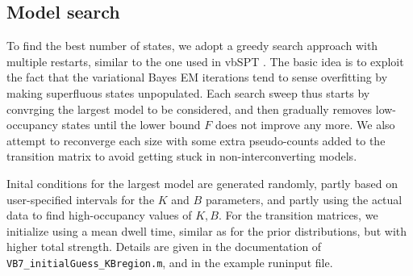 \subsection{Model search}
To find the best number of states, we adopt a greedy search approach
with multiple restarts, similar to the one used in vbSPT
\cite{persson2013}. The basic idea is to exploit the fact that the
variational Bayes EM iterations tend to sense overfitting by making
superfluous states unpopulated. Each search sweep thus starts by
convrging the largest model to be considered, and then gradually
removes low-occupancy states until the lower bound $F$ does not
improve any more. We also attempt to reconverge each size with some
extra pseudo-counts added to the transition matrix to avoid getting
stuck in non-interconverting models.

Inital conditions for the largest model are generated randomly, partly
based on user-specified intervals for the $K$ and $B$ parameters, and
partly using the actual data to find high-occupancy values of
$K,B$. For the transition matrices, we initialize using a mean dwell
time, similar as for the prior distributions, but with higher total
strength. Details are given in the documentation of
\verb+VB7_initialGuess_KBregion.m+, and in the example runinput file.
